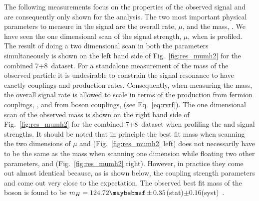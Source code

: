 The following measurements focus on the properties of the observed signal and are consequently only shown for the \MFM analysis. The two most important physical parameters to measure in the signal are the overall rate, $\mu$, and the mass, \mH. We have seen the one dimensional \NLL scan of the signal strength, $\mu$, when \mH is profiled. The result of doing a two dimensional \NLL scan in both the parameters simultaneously is shown on the left hand side of Fig.~\ref{fig:res_mumh2} for the combined 7+8~\TeV dataset. For a standalone measurement of the mass of the observed particle it is undesirable to constrain the signal resonance to have exactly \SM couplings and production rates. Consequently, when measuring the mass, the overall signal rate is allowed to scale in terms of the production from fermion couplings, \RF, and from boson couplings, \RV (see Eq.~\ref{eq:rvrf}). The one dimensional \NLL scan of the observed mass is shown on the right hand side of Fig.~\ref{fig:res_mumh2} for the combined 7+8~\TeV dataset when profiling the \RV and \RF signal strengths. It should be noted that in principle the best fit mass when scanning the two dimensions of $\mu$ and \mH (Fig.~\ref{fig:res_mumh2} left) does not necessarily have to be the same as the mass when scanning one dimension \mH while floating two other parameters, \RV and \RF (Fig.~\ref{fig:res_mumh2} right). However, in practice they come out almost identical because, as is shown below, the coupling strength parameters \RV and \RF come out very close to the \SM expectation. The observed best fit mass of the boson is found to be $\mH=124.72\pm0.35$(stat)$\pm0.16$(syst)~\GeV. 


